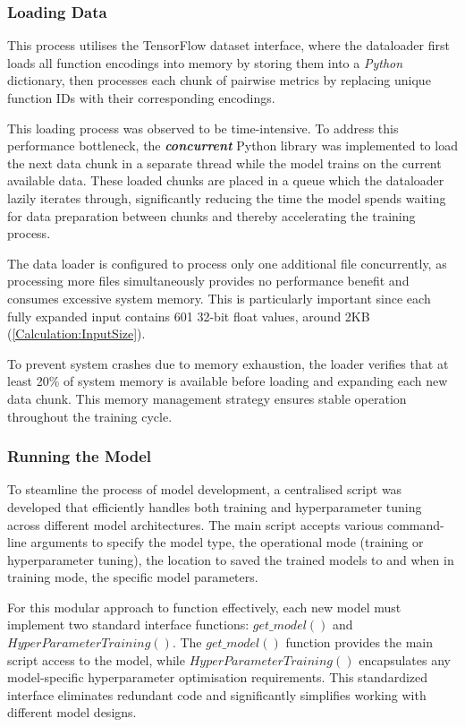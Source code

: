 
\subsubsection{Loading Data}
This process utilises the TensorFlow dataset interface, where the dataloader first loads all function encodings into memory by storing them into a \textit{Python} dictionary, then processes each chunk of pairwise metrics by replacing unique function IDs with their corresponding encodings.

This loading process was observed to be time-intensive. To address this performance bottleneck, the \textbf{\textit{concurrent}} Python library was implemented to load the next data chunk in a separate thread while the model trains on the current available data. These loaded chunks are placed in a queue which the dataloader lazily iterates through, significantly reducing the time the model spends waiting for data preparation between chunks and thereby accelerating the training process.

The data loader is configured to process only one additional file concurrently, as processing more files simultaneously provides no performance benefit and consumes excessive system memory. This is particularly important since each fully expanded input contains 601 32-bit float values, around 2KB (\ref{Calculation:InputSize}).

To prevent system crashes due to memory exhaustion, the loader verifies that at least 20\% of system memory is available before loading and expanding each new data chunk. This memory management strategy ensures stable operation throughout the training cycle.

\subsubsection{Running the Model}
To steamline the process of model development, a centralised script was developed that efficiently handles both training and hyperparameter tuning across different model architectures. The main script accepts various command-line arguments to specify the model type, the operational mode (training or hyperparameter tuning), the location to saved the trained models to and when in training mode, the specific model parameters.

For this modular approach to function effectively, each new model must implement two standard interface functions: $get\_model()$ and $HyperParameterTraining()$. The $get\_model()$ function provides the main script access to the model, while $HyperParameterTraining()$ encapsulates any model-specific hyperparameter optimisation requirements. This standardized interface eliminates redundant code and significantly simplifies working with different model designs.

